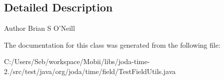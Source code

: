 \subsection{Detailed Description}
\begin{DoxyAuthor}{Author}
Brian S O'Neill 
\end{DoxyAuthor}


The documentation for this class was generated from the following file\-:\begin{DoxyCompactItemize}
\item 
C\-:/\-Users/\-Seb/workspace/\-Mobii/libs/joda-\/time-\/2./src/test/java/org/joda/time/field/Test\-Field\-Utils.\-java\end{DoxyCompactItemize}
